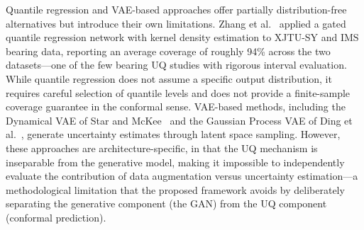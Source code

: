 Quantile regression and VAE-based approaches offer partially
distribution-free alternatives but introduce their own limitations.
Zhang et al.~\cite{zhang_explainable_2025} applied a gated quantile
regression network with kernel density estimation to XJTU-SY and IMS
bearing data, reporting an average coverage of roughly 94\% across the
two datasets---one of the few bearing UQ studies with rigorous interval
evaluation. While quantile regression does not assume a
specific output distribution, it requires careful selection of
quantile levels and does not provide a finite-sample coverage
guarantee in the conformal sense. VAE-based methods, including the
Dynamical VAE of Star and McKee~\cite{star_dynamical_2025} and the
Gaussian Process VAE of Ding et al.~\cite{10738265}, generate
uncertainty estimates through latent space sampling. However, these
approaches are architecture-specific, in that the UQ mechanism is
inseparable from the generative model, making it impossible to
independently evaluate the contribution of data augmentation versus
uncertainty estimation---a methodological limitation that the proposed
framework avoids by deliberately separating the generative component
(the GAN) from the UQ component (conformal prediction).\\

